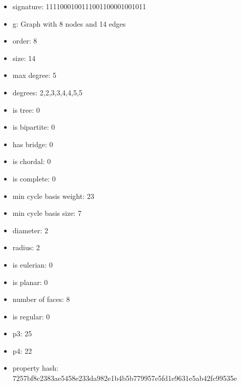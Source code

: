 \begin{itemize}
\item signature: 1111000100111001100001001011
\item g: Graph with 8 nodes and 14 edges
\item order: 8
\item size: 14
\item max degree: 5
\item degrees: 2,2,3,3,4,4,5,5
\item is tree: 0
\item is bipartite: 0
\item has bridge: 0
\item is chordal: 0
\item is complete: 0
\item min cycle basis weight: 23
\item min cycle basis size: 7
\item diameter: 2
\item radius: 2
\item is eulerian: 0
\item is planar: 0
\item number of faces: 8
\item is regular: 0
\item p3: 25
\item p4: 22
\item property hash: 7257bf8c2383ae5458e233da982e1b4b5b779957e5fd1e9631e5ab42fc99535e
\end{itemize}
\newpage
\begin{figure}
\end{figure}
